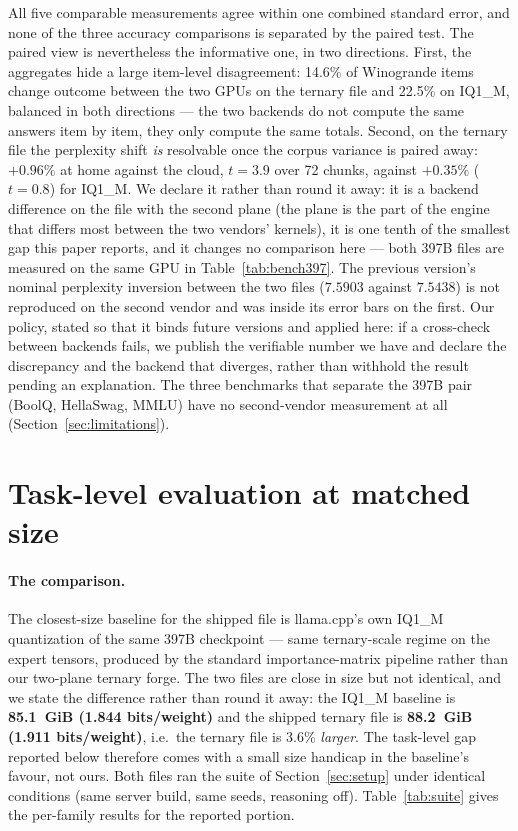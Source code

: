 \documentclass[10pt]{article} %
\begin{document}
All five comparable measurements agree within one combined standard error, and
none of the three accuracy comparisons is separated by the paired test. The
paired view is nevertheless the informative one, in two directions. First, the
aggregates hide a large item-level disagreement: 14.6\% of Winogrande items
change outcome between the two GPUs on the ternary file and 22.5\% on IQ1\_M,
balanced in both directions --- the two backends do not compute the same
answers item by item, they only compute the same totals. Second, on the
ternary file the perplexity shift \emph{is} resolvable once the corpus
variance is paired away: $+0.96\%$ at home against the cloud, $t = 3.9$ over
72 chunks, against $+0.35\%$ ($t = 0.8$) for IQ1\_M. We declare it rather than
round it away: it is a backend difference on the file with the second plane
(the plane is the part of the engine that differs most between the two
vendors' kernels), it is one tenth of the smallest gap this paper reports, and
it changes no comparison here --- both 397B files are measured on the same GPU
in Table~\ref{tab:bench397}. The previous version's nominal perplexity
inversion between the two files
($7.5903$ against $7.5438$) is not reproduced on the second vendor and was
inside its error bars on the first. Our policy, stated so that it binds future
versions and applied here: if a cross-check
between backends fails, we publish the
verifiable number we have and declare the discrepancy and the backend that
diverges, rather than withhold the result pending an explanation. The three
benchmarks that separate the 397B pair (BoolQ, HellaSwag, MMLU) have no
second-vendor measurement at all (Section~\ref{sec:limitations}).

\section{Task-level evaluation at matched size}
\label{sec:tasks}

\paragraph{The comparison.} The closest-size baseline for the shipped
file is llama.cpp's own IQ1\_M quantization
\citep{ikawrakow2024iq1m,ikawrakow2024imatrix} of the same 397B checkpoint ---
same ternary-scale regime on the expert tensors, produced by the standard
importance-matrix pipeline rather than our two-plane ternary forge. The two
files are close in size but not identical, and we state the difference rather
than round it away: the IQ1\_M baseline is \textbf{85.1~GiB (1.844
bits/weight)} and the shipped ternary file is \textbf{88.2~GiB (1.911
bits/weight)}, i.e.\ the ternary file is 3.6\% \emph{larger}. The task-level
gap reported below therefore comes with a small size handicap in the
baseline's favour, not ours. Both
files ran the suite of Section~\ref{sec:setup} under identical
conditions (same server build, same seeds, reasoning off).
Table~\ref{tab:suite} gives the per-family results for the reported portion.
\end{document}
